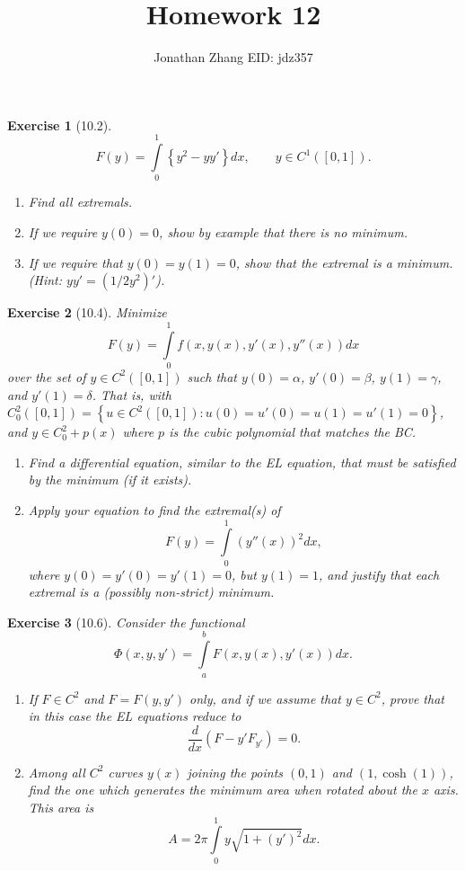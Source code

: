 \documentclass[letterpaper,twoside,11pt]{article}
\theoremstyle{mystyle}
\newtheorem*{exercise}{Exercise}
\begin{document}
\selectfont     %
\title{\vspace{-2\baselineskip} 
Homework 12
}
\author{Jonathan Zhang \qquad EID: { jdz357} }
\date{}
\maketitle


\begin{exercise}[10.2]
  \[F(y) = \int\limits_0^1 \left\{ y^2 - yy' \right\}dx, \qquad y \in C^1 \left( [0,1] \right).\]
  \begin{enumerate}
    \item Find all extremals. 
    \item If we require $y(0) = 0$, show by example that there is no minimum. 
    \item If we require that $y(0) = y(1) = 0$, show that the extremal is a minimum. (Hint: $yy' = \left( 1/2 y^2  \right)'$).
  \end{enumerate}
\end{exercise}

\begin{exercise}[10.4]
  Minimize 
  \[F(y) = \int\limits_0^1 f(x, y(x), y'(x), y''(x)) dx\]
  over the set of $y \in C^2([0,1])$ such that $y(0) = \alpha$, $y'(0) = \beta$, $y(1) = \gamma$, and $y'(1) = \delta$. That is, with $C_0^2([0,1]) = \left\{ u \in C^2 ([0,1]) : u(0) = u'(0) = u(1) = u'(1) = 0 \right\}$, and $y \in C_0^2 + p(x)$ where $p$ is the cubic polynomial that matches the BC. 
  \begin{enumerate}
    \item Find a differential equation, similar to the EL equation, that must be satisfied by the minimum (if it exists). 
    \item Apply your equation to find the extremal(s) of 
    \[F(y) = \int\limits_0^1 \left( y''(x) \right)^2 dx,\]
    where $y(0) = y'(0) = y'(1) = 0$, but $y(1) = 1$, and justify that each extremal is a (possibly non-strict) minimum. 
  \end{enumerate}
\end{exercise}



\begin{exercise}[10.6]
  Consider the functional 
  \[\Phi(x, y, y') = \int\limits_a^b F(x, y(x), y'(x))dx.\]
  \begin{enumerate}
    \item If $F \in C^2$ and $F = F(y, y')$ only, and if we assume that $y \in C^2$, prove that in this case the EL equations reduce to 
    \[\frac{d}{dx}\left( F - y'F_{y'} \right) = 0.\]
    \item Among all $C^2$ curves $y(x)$ joining the points $(0,1)$ and $(1, \cosh(1))$, find the one which generates the minimum area when rotated about the $x$ axis. This area is 
    \[A = 2\pi \int\limits_0^1 y \sqrt{1 + (y')^2} dx.\]
  \end{enumerate}
\end{exercise}
\end{document}
